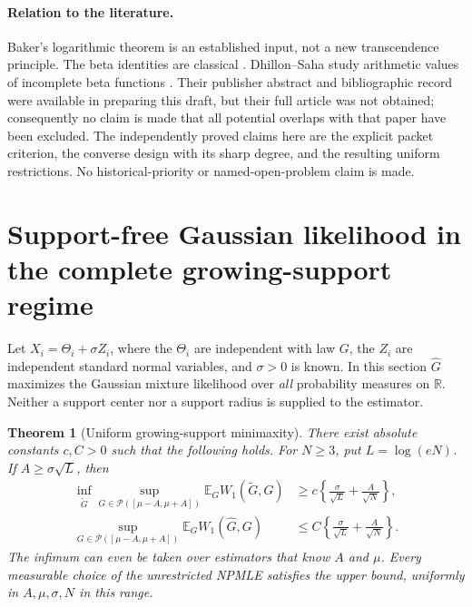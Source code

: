 \documentclass[11pt,a4paper]{article}
\newtheorem{theorem}{Theorem}[section]
\theoremstyle{definition}
\theoremstyle{remark}
\numberwithin{equation}{section}
\begin{document}
\paragraph{Relation to the literature.}
Baker's logarithmic theorem is an established input, not a new
transcendence principle. The beta identities are classical
\cite{p6:DLMF}. Dhillon--Saha study arithmetic values of incomplete
beta functions \cite{p6:bq:DhillonSaha}. Their publisher abstract and
bibliographic record were available in preparing this draft,
but their full article was not obtained; consequently no claim
is made that all potential overlaps with that paper have been
excluded. The independently proved claims here are the explicit
packet criterion, the converse design with its sharp degree,
and the resulting uniform restrictions. No historical-priority
or named-open-problem claim is made.



\section{Support-free Gaussian likelihood in the complete growing-support regime}
\label{p5:gg:sec}

Let $X_i=\Theta_i+\sigma Z_i$, where the $\Theta_i$ are independent
with law $G$, the $Z_i$ are independent standard normal variables,
and $\sigma>0$ is known.  In this section $\widehat G$ maximizes
the Gaussian mixture likelihood over \emph{all} probability measures
on $\mathbb R$.  Neither a support center nor a support radius is
supplied to the estimator.

\begin{theorem}[Uniform growing-support minimaxity]\label{p5:gg:main}
There exist absolute constants $c,C>0$ such that the following holds.
For $N\ge3$, put $L=\log(eN)$.  If $A\ge\sigma\sqrt L$, then
\begin{align*}
 \inf_{\widetilde G}\sup_{G\in\mathcal P([\mu-A,\mu+A])}
          \mathbb E_G W_1(\widetilde G,G)
 &\ge c\left\{\frac{\sigma}{\sqrt L}+\frac A{\sqrt N}\right\},\\
 \sup_{G\in\mathcal P([\mu-A,\mu+A])}
          \mathbb E_G W_1(\widehat G,G)
 &\le C\left\{\frac{\sigma}{\sqrt L}+\frac A{\sqrt N}\right\}.
\end{align*}
The infimum can even be taken over estimators that know $A$ and
$\mu$.  Every measurable choice of the unrestricted NPMLE satisfies
the upper bound, uniformly in $A,\mu,\sigma,N$ in this range.
\end{theorem}
\end{document}
